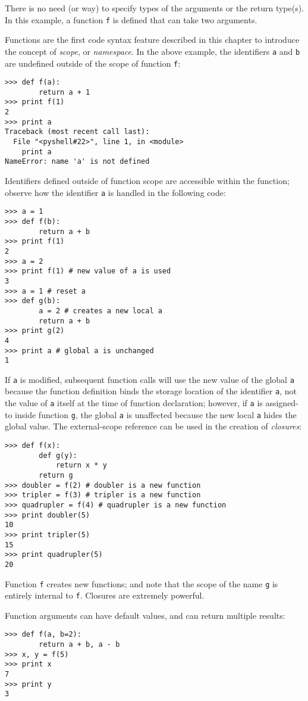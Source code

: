 \documentclass[justified,sixbynine,notoc]{tufte-book}
\def\ft{\small\tt}
\begin{document}
\begin{fullwidth}
There is no need (or way) to specify types of the arguments or the return type(s). In this example, a function {\ft f} is defined that can take two arguments.

Functions are the first code syntax feature described in this chapter to introduce the concept of {\it scope}, or {\it namespace}.  In the above example, the identifiers {\ft a} and {\ft b} are undefined outside of the scope of function {\ft f}:
\begin{lstlisting}
>>> def f(a):
        return a + 1
>>> print f(1)
2
>>> print a
Traceback (most recent call last):
  File "<pyshell#22>", line 1, in <module>
    print a
NameError: name 'a' is not defined
\end{lstlisting}

Identifiers defined outside of function scope are accessible within the function; observe how the identifier {\ft a} is handled in the following code:
\begin{lstlisting}
>>> a = 1
>>> def f(b):
        return a + b
>>> print f(1)
2
>>> a = 2
>>> print f(1) # new value of a is used
3
>>> a = 1 # reset a
>>> def g(b):
        a = 2 # creates a new local a
        return a + b
>>> print g(2)
4
>>> print a # global a is unchanged
1
\end{lstlisting}

If {\ft a} is modified, subsequent function calls will use the new value of the global {\ft a} because the function definition binds the storage location of the identifier {\ft a}, not the value of {\ft a} itself at the time of function declaration; however, if {\ft a} is assigned-to inside function {\ft g}, the global {\ft a} is unaffected because the new local {\ft a} hides the global value.  The external-scope reference can be used in the creation of {\it closures}:
\begin{lstlisting}
>>> def f(x):
        def g(y):
            return x * y
        return g
>>> doubler = f(2) # doubler is a new function
>>> tripler = f(3) # tripler is a new function
>>> quadrupler = f(4) # quadrupler is a new function
>>> print doubler(5)
10
>>> print tripler(5)
15
>>> print quadrupler(5)
20
\end{lstlisting}

Function {\ft f} creates new functions; and note that the scope of the name {\ft g} is entirely internal to {\ft f}.  Closures are extremely powerful.

Function arguments can have default values, and can return multiple results:
\begin{lstlisting}
>>> def f(a, b=2):
        return a + b, a - b
>>> x, y = f(5)
>>> print x
7
>>> print y
3
\end{lstlisting}


\end{fullwidth}
\end{document}
